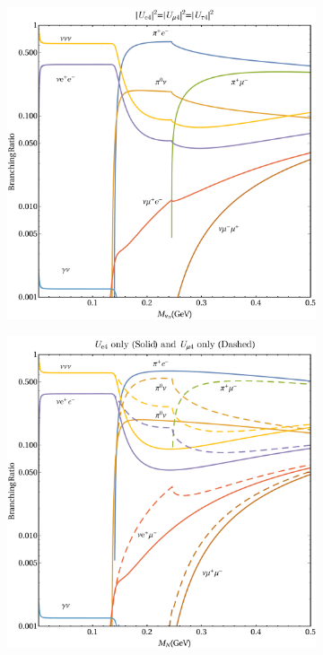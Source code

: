 \documentclass[11pt, a4paper]{article}
\begin{document}
\begin{figure}[t]
\centering
\begin{subfigure}{.5\textwidth}
  \centering
  \includegraphics[width=\linewidth]{figures/BR_notlog_square.pdf}
\end{subfigure}%
\begin{subfigure}{.5\textwidth}
 \centering
\includegraphics[width=\linewidth]{figures/BR_notlog_square2.pdf}
\end{subfigure}


\end{figure}
\end{document}
